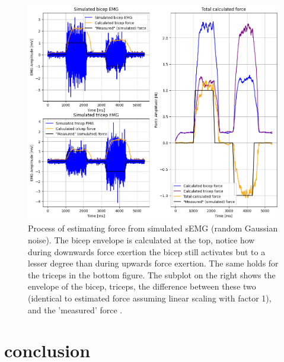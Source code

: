 \begin{figure}[h!t]
	\begin{center}
		\includegraphics[width=1.0\columnwidth]{images/force_simulation.png}
	\end{center}
	\caption{Process of estimating force from simulated sEMG (random Gaussian noise). The bicep envelope is calculated at the top, notice how during downwards force exertion the bicep still activates but to a lesser degree than during upwards force exertion. The same holds for the triceps in the bottom figure. The subplot on the right shows the envelope of the bicep, triceps, the difference between these two (identical to estimated force assuming linear scaling with factor 1), and the 'measured' force .}
	\label{fig:force_simulation}
\end{figure}

\section{conclusion}